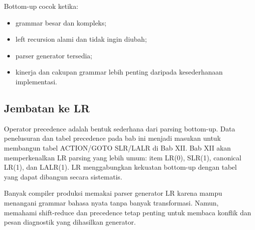 Bottom-up cocok ketika:
\begin{itemize}[leftmargin=*]
  \item grammar besar dan kompleks;
  \item left recursion alami dan tidak ingin diubah;
  \item parser generator tersedia;
  \item kinerja dan cakupan grammar lebih penting daripada
        kesederhanaan implementasi.
\end{itemize}

\subsection{Jembatan ke LR}

Operator precedence adalah bentuk sederhana dari parsing bottom-up.
Data penelusuran dan tabel precedence pada bab ini menjadi masukan
untuk membangun tabel ACTION/GOTO SLR/LALR di Bab XII. Bab XII akan
memperkenalkan LR parsing yang lebih umum: item LR(0), SLR(1),
canonical LR(1), dan LALR(1). LR menggabungkan kekuatan bottom-up
dengan tabel yang dapat dibangun secara sistematis.

\begin{infobox}
Banyak compiler produksi memakai parser generator LR karena mampu
menangani grammar bahasa nyata tanpa banyak transformasi. Namun,
memahami shift-reduce dan precedence tetap penting untuk membaca
konflik dan pesan diagnostik yang dihasilkan generator.
\end{infobox}

